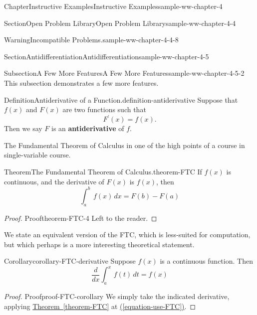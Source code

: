 \documentclass[oneside,10pt,]{book}
\newcommand{\xreffont}{\relax}
\newcommand{\terminology}[1]{\textbf{#1}}
\numberwithin{equation}{section}
\newcommand{\definiteintegral}[4]{\int_{#1}^{#2}\,#3\,d#4}
\begin{document}
\begin{chapterptx}{Chapter}{Instructive Examples}{}{Instructive Examples}{}{}{sample-ww-chapter-4}
\begin{sectionptx}{Section}{Open Problem Library}{}{Open Problem Library}{}{}{sample-ww-chapter-4-4}
\begin{warning}{Warning}{Incompatible Problems.}{sample-ww-chapter-4-4-8}
\end{warning}
\end{sectionptx}
%
%
\typeout{************************************************}
\typeout{************************************************}
%
\begin{sectionptx}{Section}{Antidifferentiation}{}{Antidifferentiation}{}{}{sample-ww-chapter-4-5}
%
%
\typeout{************************************************}
\typeout{************************************************}
%
\begin{subsectionptx}{Subsection}{A Few More Features}{}{A Few More Features}{}{}{sample-ww-chapter-4-5-2}
This subsection demonstrates a few more features.%
\begin{definition}{Definition}{Antiderivative of a Function.}{definition-antiderivative}%
Suppose that \(f(x)\) and \(F(x)\) are two functions such that%
\begin{equation*}
F^\prime(x) = f(x).
\end{equation*}
Then we say \(F\) is an \terminology{antiderivative} of \(f\).%
\end{definition}
The Fundamental Theorem of Calculus in one of the high points of a course in single-variable course.%
\begin{theorem}{Theorem}{The Fundamental Theorem of Calculus.}{}{theorem-FTC}%
%
If \(f(x)\) is continuous, and the derivative of \(F(x)\) is \(f(x)\), then%
\begin{equation*}
\definiteintegral{a}{b}{f(x)}{x}=F(b)-F(a)
\end{equation*}
%
\end{theorem}
\begin{proof}{Proof}{}{theorem-FTC-4}
Left to the reader.%
\end{proof}
We state an equivalent version of the FTC, which is less-suited for computation, but which perhaps is a more interesting theoretical statement.%
\begin{corollary}{Corollary}{}{}{corollary-FTC-derivative}%
Suppose \(f(x)\) is a continuous function.  Then%
\begin{equation}
\frac{d}{dx}\definiteintegral{a}{x}{f(t)}{t}=f(x)\label{equation-alternate-FTC}
\end{equation}
%
\end{corollary}
\begin{proof}{Proof}{}{proof-FTC-corollary}
We simply take the indicated derivative, applying \hyperref[theorem-FTC]{Theorem~{\xreffont\ref{theorem-FTC}}} at \hyperref[equation-use-FTC]{({\xreffont\ref{equation-use-FTC}})}.%

\end{proof}
\end{subsectionptx}
\end{sectionptx}
\end{chapterptx}
\end{document}
